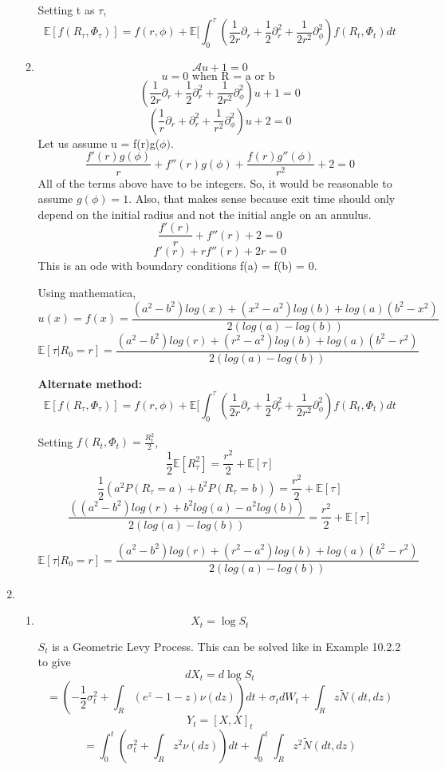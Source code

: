 \documentclass[a4paper,11pt]{article}
\begin{document}
\begin{enumerate}
\begin{enumerate}
Setting t as $\tau$,
\[\boxed{\mathbb{E}[f(R_\tau,\Phi_\tau)] =  f(r,\phi) + \mathbb{E}[\int_0^\tau (\frac{1}{2r}\partial_r+\frac{1}{2}\partial^2_r+\frac{1}{2r^2}\partial^2_\phi)f(R_t,\Phi_t) dt}\]

\item  
\[\mathcal{A}u+1=0\]
\[u=0 \text{ when R = a or b }\]
\[(\frac{1}{2r}\partial_r+\frac{1}{2}\partial^2_r+\frac{1}{2r^2}\partial^2_\phi)u + 1 = 0\]
\[(\frac{1}{r}\partial_r+\partial^2_r+\frac{1}{r^2}\partial^2_\phi)u + 2 = 0\]
Let us assume u = f(r)g($\phi)$.
\[\frac{f'(r)g(\phi)}{r}+ f''(r)g(\phi)+\frac{f(r)g''(\phi)}{r^2} + 2 = 0\]
All of the terms above have to be integers. So, it would be reasonable to assume $g(\phi)=1$. Also, that makes sense because exit time should only depend on the initial radius and not the initial angle on an annulus.
\[\frac{f'(r)}{r}+ f''(r) + 2 = 0\]
\[ f'(r)+ rf''(r) + 2r = 0\]
This is an ode with boundary conditions f(a) = f(b) = 0.

Using mathematica,
\[u(x) = f(x) =  \frac{(a^2 - b^2) log(x) + (x^2 - a^2) log(b) + log(a) (b^2 - x^2)}{2 (log(a) - log(b))}\]
\[\mathbb{E}[\tau | R_0 = r] =  \frac{(a^2 - b^2) log(r) + (r^2 - a^2) log(b) + log(a) (b^2 - r^2)}{2 (log(a) - log(b))}\]

{\bf Alternate method:}
\[\mathbb{E}[f(R_\tau,\Phi_\tau)] =  f(r,\phi) + \mathbb{E}[\int_0^\tau (\frac{1}{2r}\partial_r+\frac{1}{2}\partial^2_r+\frac{1}{2r^2}\partial^2_\phi)f(R_t,\Phi_t) dt\]

Setting $ f(R_t,\Phi_t) = \frac{R_t^2}{2} $, 
\[\frac{1}{2}\mathbb{E}[R_\tau^2] =  \frac{r^2}{2} + \mathbb{E}[\tau]\]
\[\frac{1}{2}(a^2 P(R_\tau = a) + b^2 P(R_\tau = b)) =  \frac{r^2}{2} + \mathbb{E}[\tau]\]
\[\frac{((a^2 - b^2) log(r) +b^2log(a) -a^2log(b) )}{2(log(a)-log(b))} =  \frac{r^2}{2} + \mathbb{E}[\tau]\]

\[\boxed{\mathbb{E}[\tau | R_0 = r] =  \frac{(a^2 - b^2) log(r) + (r^2 - a^2) log(b) + log(a) (b^2 - r^2)}{2 (log(a) - log(b))}}\]
\end{enumerate}



\item
\begin{enumerate}
\item
\[X_t =\log S_t\]

$S_t$ is a Geometric Levy Process. This can be solved like in Example 10.2.2 to give
\[dX_t =d\log S_t\]
\[ = ( - \frac{1}{2}\sigma_t^2 + \int_R (e^{z}-1-z)\nu(dz)) dt+ \sigma_t dW_t +\int_R z \widetilde{N}(dt,dz)\]
\[Y_t = [X,X]_t \]
\[= \int_0^t (\sigma^2_t+\int_R z^2\nu(dz)) dt+ \int_0^t \int_R z^2 \widetilde{N}(dt,dz)\]


\end{enumerate}
\end{enumerate}
\end{document}
